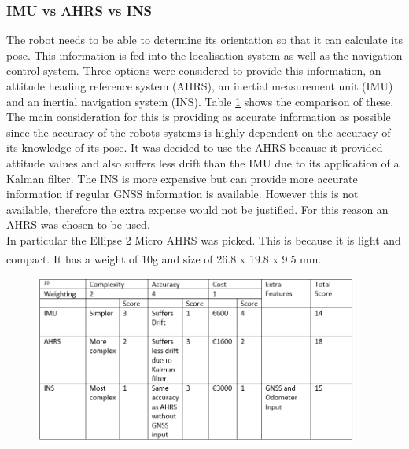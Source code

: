\documentclass[11pt]{article}		%
\newcommand{\supercite}[1]{\textsuperscript{\cite{#1}}}		%
\begin{document}
            \subsubsection{IMU vs AHRS vs INS}
            
            The robot needs to be able to determine its orientation so that it can calculate its pose. 
            This information is fed into the localisation system as well as the navigation control system. 
            Three options were considered to provide this information, an attitude heading reference system (AHRS), an inertial measurement unit (IMU) and an inertial navigation system (INS). Table \ref{AHRS_comparison} shows the comparison of these.
            \\
            The main consideration for this is providing as accurate information as possible since the accuracy of the robots systems is highly dependent on the accuracy of its knowledge of its pose. 
            It was decided to use the AHRS because it provided attitude values and also suffers less drift than the IMU due to its application of a Kalman filter. 
            The INS is more expensive but can provide more accurate information if regular GNSS information is available. 
            However this is not available, therefore the extra expense would not be justified. For this reason an AHRS was chosen to be used.
            \\
            In particular the Ellipse 2 Micro AHRS was picked.
            This is because it is light and compact. It has a weight of 10g and size of 26.8 x 19.8 x 9.5 mm. \supercite{Ellipse_Ahrs}
            
            \begin{figure}[h]
					\centering
				    \includegraphics[width=0.95\textwidth]{Table_comparing_AHRS_INS_IMU.PNG}
						\caption{}
						\label{AHRS_comparison}
				\end{figure}
				
\end{document}
